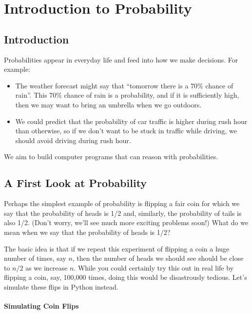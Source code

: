 \documentclass[6008notes.tex]{subfiles}
\begin{document}
\graphicspath{ {images/introprob/} }

\section{Introduction to Probability}

\subsection{Introduction}
Probabilities appear in everyday life and feed into how we make decisions. For example:

\begin{itemize}
\item The weather forecast might say that ``tomorrow there is a 70\% chance of rain''. This 70\% chance of rain is a probability, and if it is sufficiently high, then we may want to bring an umbrella when we go outdoors.

\item We could predict that the probability of car traffic is higher during rush hour than otherwise, so if we don't want to be stuck in traffic while driving, we should avoid driving during rush hour.
\end{itemize}

We aim to build computer programs that can reason with probabilities.

\subsection{A First Look at Probability}
Perhaps the simplest example of probability is flipping a fair coin for which we say that the probability of heads is 1/2 and, similarly, the probability of tails is also 1/2. (Don't worry, we'll see much more exciting problems soon!) What do we mean when we say that the probability of heads is 1/2?

The basic idea is that if we repeat this experiment of flipping a coin a huge number of times, say $n$, then the number of heads we should see should be close to $n/2$ as we increase $n$. While you could certainly try this out in real life by flipping a coin, say, 100,000 times, doing this would be disastrously tedious. Let's simulate these flips in Python instead.

\paragraph{Simulating Coin Flips}
\end{document}
